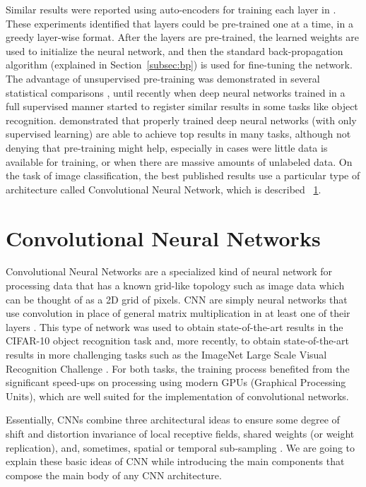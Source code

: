 \indent Similar results were reported using auto-encoders for training each layer in \cite{bengio2007greedy}. These experiments identified that layers could be pre-trained one at a time, in a greedy layer-wise format. After the layers are pre-trained, the learned weights are used to initialize the neural network, and then the standard back-propagation algorithm (explained in Section~\ref{subsec:bp}) is used for fine-tuning the network. The advantage of unsupervised pre-training was demonstrated in several statistical comparisons \cite{bengio2007greedy,larochelle2007empirical,erhan2009difficulty}, until recently when deep neural networks trained in a full supervised manner started to register similar results in some tasks like object recognition. \citealt{ciresan2012multi} demonstrated that properly trained deep neural networks (with only supervised learning) are able to achieve top results in many tasks, although not denying that pre-training might help, especially in cases were little data is available for training, or when there are massive amounts of unlabeled data. On the task of image classification, the best published results use a particular type of architecture called Convolutional Neural Network, which is described ~\ref{sec:cnn}.



\section{Convolutional Neural Networks}
\label{sec:cnn}
Convolutional Neural Networks are a specialized kind of neural network for processing data that has a known grid-like topology such as image data which can be thought of as a 2D grid of pixels. CNN are simply neural networks that use convolution in place of general matrix multiplication in at least one of their layers \cite{Goodfellow-et-al-2016-Book}. This type of network was used to obtain state-of-the-art results in the CIFAR-10 object recognition task \cite{ciresan2012multi} and, more recently, to obtain state-of-the-art results in more challenging tasks such as the ImageNet Large Scale Visual Recognition Challenge \cite{russakovsky2015imagenet}. For both tasks, the training process benefited from the significant speed-ups on processing using modern GPUs (Graphical Processing Units), which are well suited for the implementation of convolutional networks.


Essentially, CNNs combine three architectural ideas to ensure some degree of shift and distortion invariance of local receptive fields, shared weights (or weight replication), and, sometimes, spatial or temporal sub-sampling \cite{lecun2010convolutional}. We are going to explain these basic ideas of CNN while introducing the main components that compose the main body of any CNN architecture.

